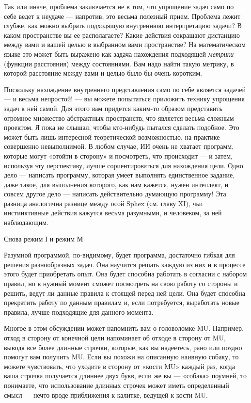 Так или иначе, проблема заключается не в том, что упрощение задач само по себе ведет к неудаче --- напротив, это весьма полезный прием. Проблема лежит глубже, как можно выбрать подходящую внутреннюю интерпретацию задачи? В каком пространстве вы ее располагаете? Какие действия сокращают дистанцию между вами и вашей целью в выбранном вами пространстве? На математическом языке это может быть выражено как задача нахождения подходящей \emph{метрики} (функции расстояния) между состояниями. Вам надо найти такую метрику, в которой расстояние между вами и целью было бы очень коротким.

Поскольку нахождение внутреннего представления само по себе является задачей --- и весьма непростой! --- вы можете попытаться приложить технику упрощения задач к ней самой. Для этого вам придется каким-то образом представить огромное множество абстрактных пространств, что является весьма сложным проектом. Я пока не слышал, чтобы кто-нибудь пытался сделать подобное. Это может быть лишь интересной теоретической возможностью, на практике совершенно невыполнимой. В любом случае, ИИ очень не хватает программ, которые могут «отойти в сторону» и посмотреть, что происходит --- и затем, используя эту перспективу, лучше сориентироваться для нахождения цели. Одно дело --- написать программу, которая умеет выполнять единственное задание, даже такое, для выполнения которого, как нам кажется, нужен интеллект, и совсем другое дело --- написать действительно думающую программу! Эта разница аналогична разнице между осой Sphex (см. главу XI), чьи инстинктивные действия кажутся весьма разумными, и человеком, за ней наблюдающим.

Снова режим I и режим М

Разумной программой, по-видимому, будет программа, достаточно гибкая для решения разнообразных задач. Она научится решать каждую из них и в процессе этого будет приобретать опыт. Она будет способна работать в согласии с набором правил, но в нужный момент сможет посмотреть на свою работу со стороны и решить, ведут ли данные правила к стоящей перед ней цели. Она будет способна прекратить работу по данным правилам и, если потребуется, выработать новые правила, лучше подходящие для данного момента.

Многое в этом обсуждении может напомнить вам о головоломке MU. Например, отход в сторону от конечной цели напоминает об отходе в сторону от MU, выводя все более длинные строчки, которые, как вы надеетесь, рано или поздно помогут вам получить MU. Если вы похожи на описанную наивную собаку, то можете чувствовать, что уходите в сторону от «кости MU» каждый раз, когда ваша строчка получается длиннее двух букв, если же вы --- «собака» поумней, то понимаете, что использование длинных строчек может иметь определенный смысл --- нечто вроде приближения к калитке, ведущей к кости MU.

